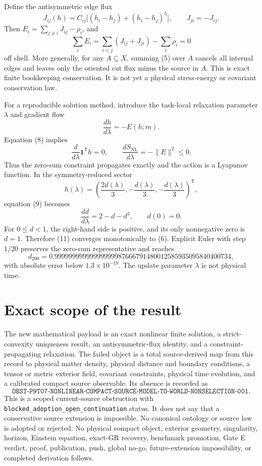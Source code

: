 \documentclass[11pt]{article}
\newcommand{\one}{\mathbf 1}
\begin{document}
Define the antisymmetric edge flux
\[
 J_{ij}(h)=C_{ij}
 \bigl[(h_i-h_j)+(h_i-h_j)^3\bigr],
 \qquad J_{ji}=-J_{ij}.
 \tag{7}
\]
Then \(E_i=\sum_{j\ne i}J_{ij}-\rho_i\), and
\[
 \sum_iE_i=\sum_{i<j}(J_{ij}+J_{ji})-\sum_i\rho_i=0
 \tag{8}
\]
off shell.  More generally, for any \(A\subseteq X\), summing (5) over
\(A\) cancels all internal edges and leaves only the oriented cut flux minus
the source in \(A\).  This is exact finite bookkeeping conservation.  It is
not yet a physical stress-energy or covariant conservation law.

For a reproducible solution method, introduce the task-local relaxation
parameter \(\lambda\) and gradient flow
\[
 \frac{dh}{d\lambda}=-E(h;m).
 \tag{9}
\]
Equation (8) implies
\[
 \frac{d}{d\lambda}\one^{\mathsf T}h=0,
 \qquad
 \frac{dS_{\mathrm{NL}}}{d\lambda}=-\lVert E\rVert^2\leq0.
 \tag{10}
\]
Thus the zero-sum constraint propagates exactly and the action is a Lyapunov
function.  In the symmetry-reduced sector
\[
 h(\lambda)=
 \left(\frac{2d(\lambda)}3,-\frac{d(\lambda)}3,
       -\frac{d(\lambda)}3\right)^{\mathsf T},
\]
equation (9) becomes
\[
 \frac{dd}{d\lambda}=2-d-d^3,\qquad d(0)=0.
 \tag{11}
\]
For \(0\leq d<1\), the right-hand side is positive, and its only nonnegative
zero is \(d=1\).  Therefore (11) converges monotonically to (6).  Explicit
Euler with step \(1/20\) preserves the zero-sum representative and reaches
\[
 d_{200}=0.99999999999999999987666791480012585935095840400734,
\]
with absolute error below \(1.3\times10^{-19}\).  The update parameter
\(\lambda\) is not physical time.

\section{Exact scope of the result}

The new mathematical payload is an exact nonlinear finite solution, a
strict-convexity uniqueness result, an antisymmetric-flux identity, and a
constraint-propagating relaxation.  The failed object is a total
source-derived map from this record to physical matter density, physical
distance and boundary conditions, a tensor or metric exterior field,
covariant constraints, physical time evolution, and a calibrated compact
source observable.  Its absence is recorded as
\[
\texttt{OBST-P9T07-NONLINEAR-COMPACT-SOURCE-MODEL-TO-WORLD-NONSELECTION-001}.
\]
This is a scoped current-source obstruction with
\texttt{blocked\_adoption\_open\_continuation} status.  It does not say that a
conservative source extension is impossible.  No canonical ontology or
source law is adopted or rejected.  No physical compact object, exterior
geometry, singularity, horizon, Einstein equation, exact-GR recovery,
benchmark promotion, Gate E verdict, proof, publication, push, global no-go,
future-extension impossibility, or completed derivation follows.
\end{document}
